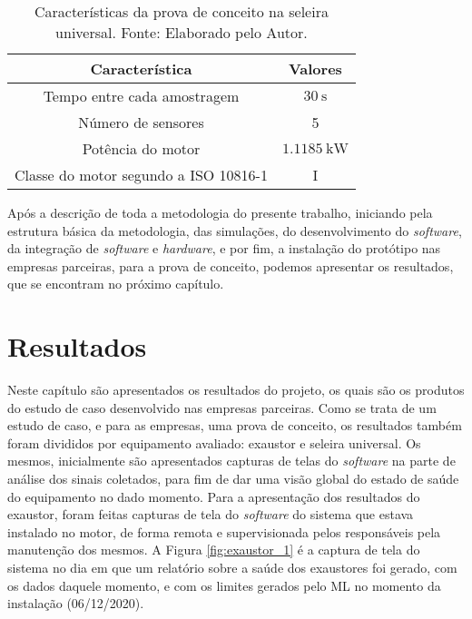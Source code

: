 \documentclass[a4paper]{ifacconf}
\begin{document}
\begin{table}[H]
    \caption{Características da prova de conceito na seleira universal. Fonte: Elaborado pelo Autor.}
    \label{tab:seleira_universal}
    \centering%
    \begin{minipage}{.33\textwidth}
      \begin{tabular*}{\textwidth}{c|c}
        \hline
        Característica                          & Valores                                    \\ \hline
        \hline
        Tempo entre cada amostragem             &  $\SI{30}{\second}$                        \\
        Número de sensores                      &  5                                         \\ 
        Potência do motor                       &  $\SI{1.1185}{\kilo\watt}$                 \\
        Classe do motor segundo a  ISO 10816-1  &  I                                         \\
      \end{tabular*}
    \end{minipage}
  \end{table}

Após a descrição de toda a metodologia do presente trabalho, iniciando pela estrutura básica da metodologia, das simulações, do desenvolvimento
do \textit{software}, da integração de \textit{software} e \textit{hardware}, e por fim, a instalação do protótipo nas empresas parceiras, para a prova de conceito, 
podemos apresentar os resultados, que se encontram no próximo capítulo.


\section{Resultados}

Neste capítulo são apresentados os resultados do projeto, os quais são os produtos do estudo de caso desenvolvido nas empresas parceiras.
Como se trata de um estudo de caso, e para as empresas, uma prova de conceito, os resultados também foram divididos por equipamento avaliado:
exaustor e seleira universal. Os mesmos, inicialmente são apresentados capturas de telas do \textit{software} na parte de análise dos sinais coletados, para fim
de dar uma visão global do estado de saúde do equipamento no dado momento. Para a apresentação dos resultados do exaustor, foram feitas capturas de tela do \textit{software} do sistema que estava instalado no motor, de forma
remota e supervisionada pelos responsáveis pela manutenção dos mesmos. A Figura \ref{fig:exaustor_1} é a captura de tela do sistema no dia
em que um relatório sobre a saúde dos exaustores foi gerado, com os dados daquele momento, e com os limites gerados pelo ML
no momento da instalação (06/12/2020).
\end{document}
